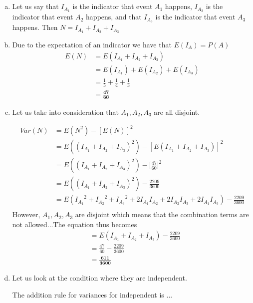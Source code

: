 \documentclass[10pt]{report}
\begin{document}
 \subsection{}
 \begin{enumerate}[(a)]
 \item Let us say that $I_{A_1} $ is the indicator that event $A_1 $ happens, $I_{A_2} $ is the indicator that event $A_2 $ happens, and that $I_{A_3} $ is the indicator that event $A_3 $ happens. Then $N = I_{A_1} + I_{A_2} + I_{A_3} $
 \item Due to the expectation of an indicator we have that $E(I_A) = P(A) $ \begin{align*}
 E(N) &= E(I_{A_1} + I_{A_2} + I_{A_3}) \\
 &= E(I_{A_1}) + E(I_{A_2}) + E(I_{A_3}) \\
 &= \frac{1}{5} + \frac{1}{4} + \frac{1}{3} \\
 &= \mathbf{\frac{47}{60}}
 \end{align*}
 \item Let us take into consideration that $A_1, A_2, A_3 $ are all disjoint.
  \begin{center}
 \begin{align*}
 Var(N) &=E(N^2) - [E(N)]^2 \\
 &=E(( I_{A_1} + I_{A_2} + I_{A_3})^2) - [E( I_{A_1} + I_{A_2} + I_{A_3})]^2 \\
 &= E(( I_{A_1} + I_{A_2} + I_{A_3})^2) - \bigg[\frac{47}{60}\bigg]^2 \\
 &= E(( I_{A_1} + I_{A_2} + I_{A_3})^2) - \frac{2209}{3600} \\
 &=E({I_{A_1}}^2 +{ I_{A_2}}^2 + {I_{A_3}}^2 + 2I_{A_1}I_{A_2} + 2I_{A_2}I_{A_3} + 2I_{A_1}I_{A_3}) - \frac{2209}{3600} \\
 \end{align*}
 However, $A_1, A_2, A_3 $ are disjoint which means that the combination terms are not allowed...The equation thus becomes 
 \begin{align*}
 &=E({I_{A_1}} +{ I_{A_2}} + {I_{A_3}}) - \frac{2209}{3600}  \\
 &= \frac{47}{60} - \frac{2209}{3600} \\
 &= \mathbf{\frac{611}{3600}}
 \end{align*}
  \end{center}
  \item Let us look at the condition where they are independent. 
  \begin{center}
  The addition rule for variances for independent is ...

\end{center}
\end{enumerate}
\end{document}

